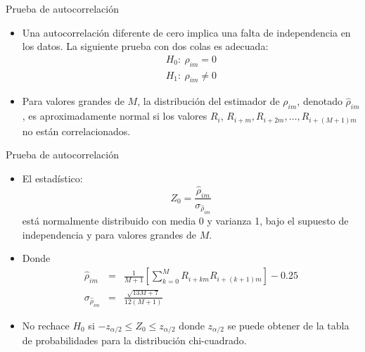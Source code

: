 \begin{frame}{Prueba de autocorrelación}
    \begin{itemize}
        \item Una autocorrelación diferente de cero implica una falta de independencia en los datos. La siguiente prueba con dos colas es adecuada:
        \begin{eqnarray*}
            H_0:~\rho_{im} = 0\\
            H_1:~\rho_{im} \neq 0
        \end{eqnarray*}
        \item Para valores grandes de $M$, la distribución del estimador de $\rho_{im}$, denotado $\hat{\rho}_{im}$, es aproximadamente normal si los valores $R_i$, $R_{i+m}, R_{i+2m},\dots, R_{i+(M+1)m}$ no están correlacionados. 
        
    \end{itemize}
    
\end{frame}

\begin{frame}{Prueba de autocorrelación}
    \begin{itemize}

        \item El estadístico: 
        \begin{equation*}
            Z_0=\frac{\hat{\rho}_{im}}{\sigma_{\hat{\rho}_{im}}}
        \end{equation*}
        está normalmente distribuido con media 0 y varianza 1, bajo el supuesto de independencia y para valores grandes de $M$.
        
        \item Donde \begin{eqnarray*}
            \hat{\rho}_{im}&=&\frac{1}{M+1}\left[\sum_{k=0}^{M}{R_{i+km}R_{i+(k+1)m}}\right]-0.25\\
            \sigma_{\hat{\rho}_{im}}&=&\frac{\sqrt{13M+7}}{12(M+1)}
        \end{eqnarray*}
        
        \item No rechace $H_0$ si $-z_{\alpha/2}\leq Z_0 \leq z_{\alpha/2}$ donde $z_{\alpha/2}$ se puede obtener de la tabla de probabilidades para la distribución chi-cuadrado.
    \end{itemize}
    
\end{frame}


